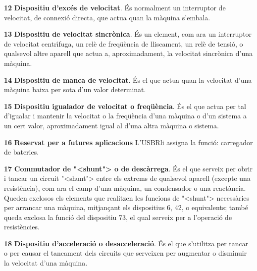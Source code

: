 \begin{multicols}{2}
\begin{list}{}
\item[\textbf{12}]  \textbf{Dispositiu d'exc\'{e}s de velocitat}. \'{E}s normalment un
interruptor de velocitat, de connexi\'{o} directa, que
actua quan la m\`{a}quina  s'embala.

\item[\textbf{13}]  \textbf{Dispositiu de
velocitat sincr\`{o}nica}. \'{E}s un element, com ara un interruptor de
velocitat centr\'{\i}fuga, un rel\`{e} de freq\"{u}\`{e}ncia de lliscament, un rel\`{e}
de tensi\'{o}, o qualsevol altre aparell que actua a, aproximadament, la
velocitat sincr\`{o}nica d'una m\`{a}quina.

\item[\textbf{14}]  \textbf{Dispositiu de manca de velocitat}. \'{E}s el que actua quan la velocitat d'una m\`{a}quina baixa per sota d'un valor determinat.

\item[\textbf{15}] 
\textbf{Dispositiu igualador de velocitat o freq\"{u}\`{e}ncia}. \'{E}s el que
actua per tal d'igualar i mantenir la velocitat o la  freq\"{u}\`{e}ncia
d'una m\`{a}quina o d'un sistema a un cert valor, aproximadament igual
al  d'una altra m\`{a}quina o sistema.

\item[\textbf{16}] \textbf{Reservat per a  futures aplicacions}
L'\textsf{USBR}\footnotemark[1] li assigna la funci\'{o}: carregador de
bateries.

\item[\textbf{17}]  \textbf{Commutador
de  {"<}shunt{">} o de desc\`{a}rrega}. \'{E}s el que serveix per obrir i tancar
un circuit {"<}shunt{">} entre els extrems de qualsevol aparell (excepte
una resist\`{e}ncia), com ara el camp d'una m\`{a}quina, un condensador o
una react\`{a}ncia. Queden exclosos els elements que realitzen les
funcions de {"<}shunt{">} necess\`{a}ries per arrancar una m\`{a}quina, mitjan\c{c}ant
els dispositius 6, 42, o equivalents; tamb\'{e} queda exclosa la funci\'{o}
del dispositiu 73, el qual serveix per a l'operaci\'{o} de resist\`{e}ncies.

\item[\textbf{18}]  \textbf{Dispositiu d'acceleraci\'{o} o desacceleraci\'{o}}. \'{E}s
el que s'utilitza per tancar o per causar el tancament dels circuits
que serveixen per augmentar o disminuir la velocitat d'una m\`{a}quina.


\end{list}
\end{multicols}
